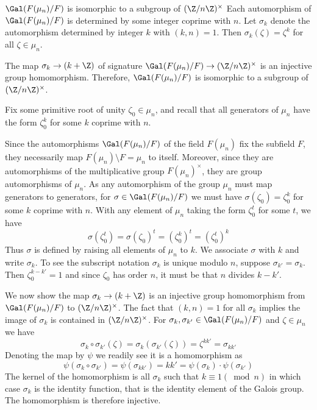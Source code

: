 \begin{theorem}{$\Gal(F(\mu_n)/F)$ is isomorphic to a subgroup of $(\Z/n\Z)^\times$}
    Each automorphism of $\Gal(F(\mu_n)/F)$ is determined by some integer coprime with $n$.
    Let $\sigma_k$ denote the automorphism determined by integer $k$ with $(k,n)=1$.
    Then $\sigma_k(\zeta)=\zeta^k$ for all $\zeta\in\mu_n$.

    The map $\sigma_k\to(k+\Z)$ of signature $\Gal(F(\mu_n)/F)\to(\Z/n\Z)^\times$ is an injective group homomorphism.
    Therefore, $\Gal(F(\mu_n)/F)$ is isomorphic to a subgroup of $(\Z/n\Z)^\times$.

    \proof
    Fix some primitive root of unity $\zeta_0\in\mu_n$, and recall that all generators of $\mu_n$ have the form $\zeta_0^k$ for some $k$ coprime with $n$.

    Since the automorphisms $\Gal(F(\mu_n)/F)$ of the field $F(\mu_n)$ fix the subfield $F$, they necessarily map $F(\mu_n)\setminus F = \mu_n$ to itself.
    Moreover, since they are automorphisms of the multiplicative group $F(\mu_n)^\times$, they are group automorphisms of $\mu_n$.
    As any automorphism of the group $\mu_n$ must map generators to generators, for $\sigma\in\Gal(F(\mu_n)/F)$ we must have $\sigma(\zeta_0)=\zeta_0^k$ for some $k$ coprime with $n$.
    With any element of $\mu_n$ taking the form $\zeta_0^t$ for some $t$, we have
    \begin{equation}
        \sigma(\zeta_0^t) = \sigma(\zeta_0)^t = (\zeta_0^k)^t = (\zeta_0^t)^k
    \end{equation}
    Thus $\sigma$ is defined by raising all elements of $\mu_n$ to $k$.
    We associate $\sigma$ with $k$ and write $\sigma_k$.
    To see the subscript notation $\sigma_k$ is unique modulo $n$, suppose $\sigma_{k'}=\sigma_k$.
    Then $\zeta_0^{k-k'}=1$ and since $\zeta_0$ has order $n$, it must be that $n$ divides $k-k'$.

    We now show the map $\sigma_k\to(k+\Z)$ is an injective group homomorphism from $\Gal(F(\mu_n)/F)$ to $(\Z/n\Z)^\times$.
    The fact that $(k,n)=1$ for all $\sigma_k$ implies the image of $\sigma_k$ is contained in $(\Z/n\Z)^\times$.
    For $\sigma_k,\sigma_{k'}\in\Gal(F(\mu_n)/F)$ and $\zeta\in\mu_n$ we have 
    \begin{equation}
        \sigma_k\circ\sigma_{k'}(\zeta) = \sigma_k(\sigma_{k'}(\zeta))
        = \zeta^{kk'} = \sigma_{kk'}
    \end{equation}
    Denoting the map by $\psi$ we readily see it is a homomorphism as
    \begin{equation}
        \psi(\sigma_k\circ\sigma_{k'}) = \psi(\sigma_{kk'}) = kk' = \psi(\sigma_k)\cdot\psi(\sigma_{k'})
    \end{equation}
    The kernel of the homomorphism is all $\sigma_k$ such that $k\equiv1(\bmod n)$ in which case $\sigma_k$ is the identity function, that is the identity element of the Galois group.
    The homomorphism is therefore injective.
\end{theorem}


